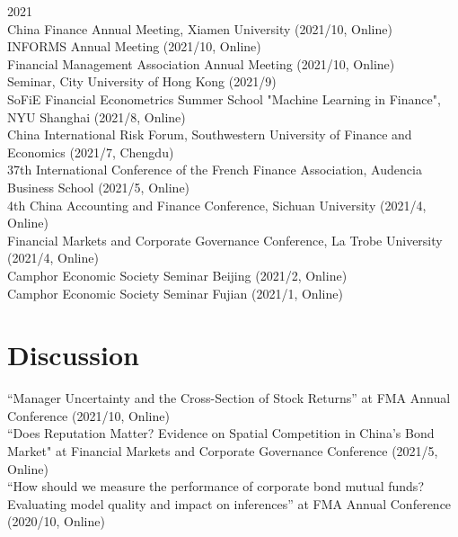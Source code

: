 \documentclass[margin]{res}
\begin{document}
\begin{resume}
		2021 \\
		China Finance Annual Meeting, Xiamen University (2021/10, Online) \\
		INFORMS Annual Meeting (2021/10, Online) \\
		Financial Management Association Annual Meeting (2021/10, Online) \\
		Seminar, City University of Hong Kong (2021/9) \\
		SoFiE Financial Econometrics Summer School "Machine Learning in Finance", NYU Shanghai (2021/8, Online) \\
		China International Risk Forum, Southwestern University of Finance and Economics  (2021/7, Chengdu) \\
		37th International Conference of the French Finance Association, Audencia Business School (2021/5, Online) \\
		4th China Accounting and Finance Conference, Sichuan University (2021/4, Online) \\
		Financial Markets and Corporate Governance Conference, La Trobe University (2021/4, Online) \\
		Camphor Economic Society Seminar Beijing (2021/2, Online) \\
		Camphor Economic Society Seminar Fujian (2021/1, Online)\\
		
		
		\section{\sc Discussion}
		
		``Manager Uncertainty and the Cross-Section of Stock Returns'' at FMA Annual Conference (2021/10, Online)
		\\
		``Does Reputation Matter? Evidence on Spatial Competition in China’s Bond Market" at Financial Markets and Corporate Governance Conference (2021/5, Online)
		\\
		``How should we measure the performance of corporate bond mutual funds? Evaluating model quality and impact on inferences'' at FMA Annual Conference (2020/10, Online)
		\\
		
		

\end{resume}
\end{document}
